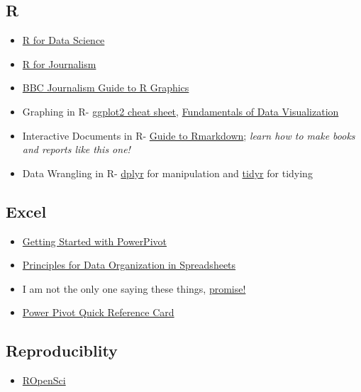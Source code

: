 \documentclass[
]{book}
\providecommand{\tightlist}{%
  \setlength{\itemsep}{0pt}\setlength{\parskip}{0pt}}
\begin{document}
\hypertarget{r}{%
\subsection{R}\label{r}}

\begin{itemize}
\tightlist
\item
  \href{https://r4ds.had.co.nz/}{R for Data Science}
\item
  \href{https://learn.r-journalism.com/en/}{R for Journalism}
\item
  \href{https://bbc.github.io/rcookbook/}{BBC Journalism Guide to R Graphics}
\item
  Graphing in R- \href{https://rstudio.com/wp-content/uploads/2015/03/ggplot2-cheatsheet.pdf}{ggplot2 cheat sheet}, \href{https://serialmentor.com/dataviz/}{Fundamentals of Data Visualization}
\item
  Interactive Documents in R- \href{https://bookdown.org/yihui/rmarkdown/}{Guide to Rmarkdown}; \emph{learn how to make books and reports like this one!}
\item
  Data Wrangling in R- \href{https://dplyr.tidyverse.org/}{dplyr} for manipulation and \href{https://github.com/tyleransom/EconometricsLabs/blob/master/tidyRcheatsheet.pdf}{tidyr} for tidying
\end{itemize}

\hypertarget{excel}{%
\subsection{Excel}\label{excel}}

\begin{itemize}
\tightlist
\item
  \href{https://support.office.com/en-us/article/get-started-with-power-pivot-in-microsoft-excel-fdfcf944-7876-424a-8437-1a6c1043a80b}{Getting Started with PowerPivot}
\item
  \href{https://www.tandfonline.com/doi/full/10.1080/00031305.2017.1375989}{Principles for Data Organization in Spreadsheets}
\item
  I am not the only one saying these things, \href{https://towardsdatascience.com/microsoft-excel-in-the-era-of-big-data-401e67ca28a5}{promise!}
\item
  \href{https://powerpivotpro.com/2015/10/giving-back-steal-this-reference-card/\#downloads}{Power Pivot Quick Reference Card}
\end{itemize}

\hypertarget{reproduciblity}{%
\subsection{Reproduciblity}\label{reproduciblity}}

\begin{itemize}
\tightlist
\item
  \href{https://ropensci.org}{ROpenSci}
\end{itemize}

  
\end{document}
